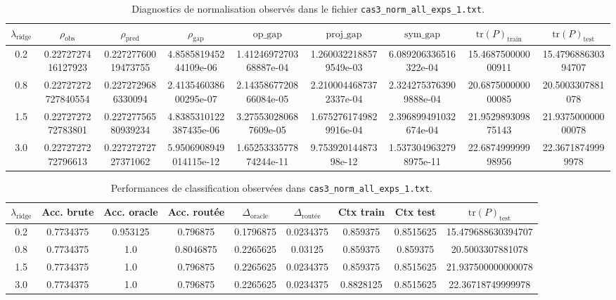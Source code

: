\begin{table}[ht]
\centering
\small
\begin{tabular}{ccccccccc}
\hline
$\lambda_{\mathrm{ridge}}$
&
$\rho_{\mathrm{obs}}$
&
$\rho_{\mathrm{pred}}$
&
$\rho_{\mathrm{gap}}$
&
$\mathrm{op\_gap}$
&
$\mathrm{proj\_gap}$
&
$\mathrm{sym\_gap}$
&
$\mathrm{tr}(P)_{\mathrm{train}}$
&
$\mathrm{tr}(P)_{\mathrm{test}}$
\\
\hline

0.2
&
0.2272727416127923
&
0.22727760019473755
&
4.858581945244109e-06
&
1.4124697270368887e-04
&
1.2600322188579549e-03
&
6.089206336516322e-04
&
15.468750000000911
&
15.479688630394707
\\

0.8
&
0.22727272727840554
&
0.2272729686330094
&
2.413546038600295e-07
&
2.1435867720866084e-05
&
2.2100044687372337e-04
&
2.3242753763909888e-04
&
20.687500000000085
&
20.5003307881078
\\

1.5
&
0.2272727272783801
&
0.22727756580939234
&
4.8385310122387435e-06
&
3.275530280687609e-05
&
1.6752761749829916e-04
&
2.396899491032674e-04
&
21.952989309875143
&
21.937500000000078
\\

3.0
&
0.2272727272796613
&
0.22727272727371062
&
5.9506908949014115e-12
&
1.6525333577874244e-11
&
9.75392014487398e-12
&
1.5373049632798975e-11
&
22.687499999998956
&
22.36718749999978
\\

\hline
\end{tabular}
\caption{Diagnostics de normalisation observés dans le fichier
\texttt{cas3\_norm\_all\_exps\_1.txt}.}
\end{table}




\begin{table}[ht]
\centering
\small
\begin{tabular}{ccccccccc}
\hline
$\lambda_{\mathrm{ridge}}$
&
Acc. brute
&
Acc. oracle
&
Acc. routée
&
$\Delta_{\mathrm{oracle}}$
&
$\Delta_{\mathrm{routée}}$
&
Ctx train
&
Ctx test
&
$\mathrm{tr}(P)_{\mathrm{test}}$
\\
\hline

0.2
&
0.7734375
&
0.953125
&
0.796875
&
0.1796875
&
0.0234375
&
0.859375
&
0.8515625
&
15.479688630394707
\\

0.8
&
0.7734375
&
1.0
&
0.8046875
&
0.2265625
&
0.03125
&
0.859375
&
0.859375
&
20.5003307881078
\\

1.5
&
0.7734375
&
1.0
&
0.796875
&
0.2265625
&
0.0234375
&
0.859375
&
0.8515625
&
21.937500000000078
\\

3.0
&
0.7734375
&
1.0
&
0.796875
&
0.2265625
&
0.0234375
&
0.8828125
&
0.8515625
&
22.36718749999978
\\

\hline
\end{tabular}
\caption{Performances de classification observées dans
\texttt{cas3\_norm\_all\_exps\_1.txt}.}
\end{table}




